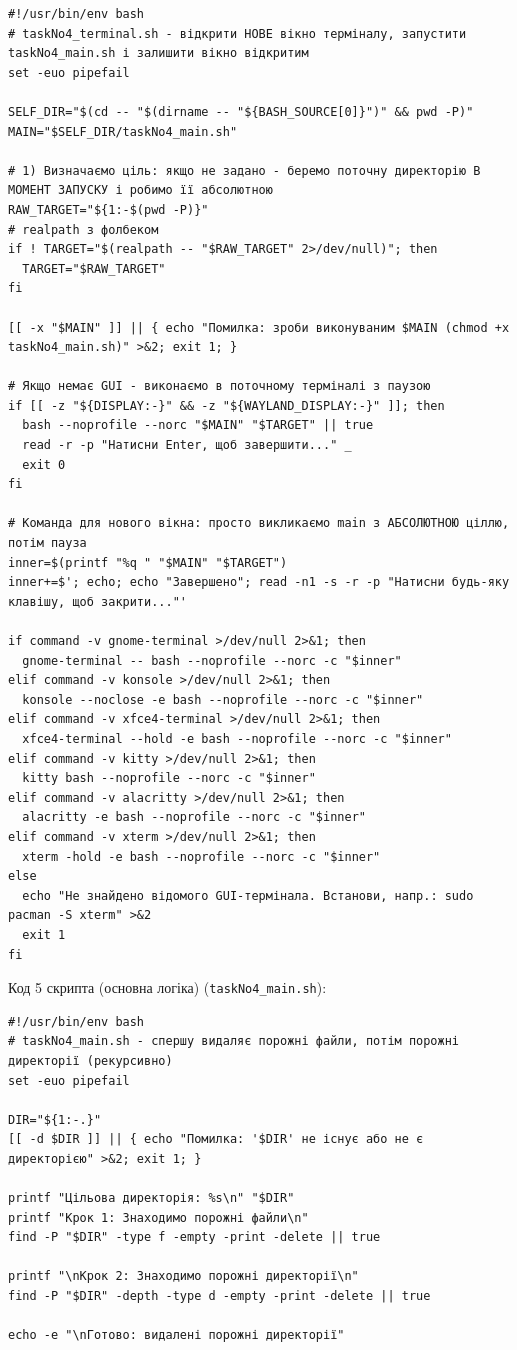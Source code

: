 \documentclass[a4paper,12pt]{article}
\begin{document}
    \begin{verbatim}
#!/usr/bin/env bash
# taskNo4_terminal.sh - відкрити НОВЕ вікно терміналу, запустити taskNo4_main.sh і залишити вікно відкритим
set -euo pipefail

SELF_DIR="$(cd -- "$(dirname -- "${BASH_SOURCE[0]}")" && pwd -P)"
MAIN="$SELF_DIR/taskNo4_main.sh"

# 1) Визначаємо ціль: якщо не задано - беремо поточну директорію В МОМЕНТ ЗАПУСКУ і робимо її абсолютною
RAW_TARGET="${1:-$(pwd -P)}"
# realpath з фолбеком
if ! TARGET="$(realpath -- "$RAW_TARGET" 2>/dev/null)"; then
  TARGET="$RAW_TARGET"
fi

[[ -x "$MAIN" ]] || { echo "Помилка: зроби виконуваним $MAIN (chmod +x taskNo4_main.sh)" >&2; exit 1; }

# Якщо немає GUI - виконаємо в поточному терміналі з паузою
if [[ -z "${DISPLAY:-}" && -z "${WAYLAND_DISPLAY:-}" ]]; then
  bash --noprofile --norc "$MAIN" "$TARGET" || true
  read -r -p "Натисни Enter, щоб завершити..." _
  exit 0
fi

# Команда для нового вікна: просто викликаємо main з АБСОЛЮТНОЮ ціллю, потім пауза
inner=$(printf "%q " "$MAIN" "$TARGET")
inner+=$'; echo; echo "Завершено"; read -n1 -s -r -p "Натисни будь-яку клавішу, щоб закрити..."'

if command -v gnome-terminal >/dev/null 2>&1; then
  gnome-terminal -- bash --noprofile --norc -c "$inner"
elif command -v konsole >/dev/null 2>&1; then
  konsole --noclose -e bash --noprofile --norc -c "$inner"
elif command -v xfce4-terminal >/dev/null 2>&1; then
  xfce4-terminal --hold -e bash --noprofile --norc -c "$inner"
elif command -v kitty >/dev/null 2>&1; then
  kitty bash --noprofile --norc -c "$inner"
elif command -v alacritty >/dev/null 2>&1; then
  alacritty -e bash --noprofile --norc -c "$inner"
elif command -v xterm >/dev/null 2>&1; then
  xterm -hold -e bash --noprofile --norc -c "$inner"
else
  echo "Не знайдено відомого GUI-термінала. Встанови, напр.: sudo pacman -S xterm" >&2
  exit 1
fi
    \end{verbatim}

    Код 5 скрипта (основна логіка) (\texttt{taskNo4\_main.sh}):

    \begin{verbatim}
#!/usr/bin/env bash
# taskNo4_main.sh - спершу видаляє порожні файли, потім порожні директорії (рекурсивно)
set -euo pipefail

DIR="${1:-.}"
[[ -d $DIR ]] || { echo "Помилка: '$DIR' не існує або не є директорією" >&2; exit 1; }

printf "Цільова директорія: %s\n" "$DIR"
printf "Крок 1: Знаходимо порожні файли\n"
find -P "$DIR" -type f -empty -print -delete || true

printf "\nКрок 2: Знаходимо порожні директорії\n"
find -P "$DIR" -depth -type d -empty -print -delete || true

echo -e "\nГотово: видалені порожні директорії"
    \end{verbatim}
\end{document}
